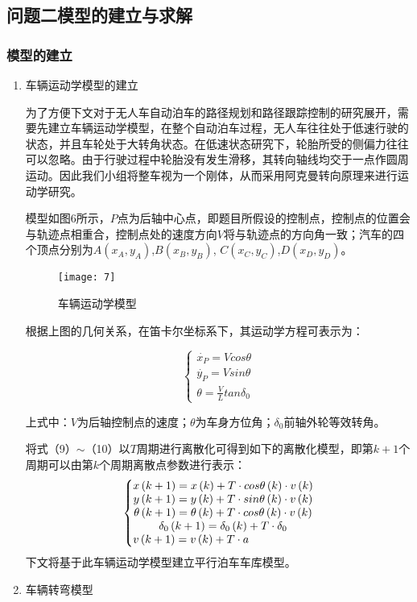 \documentclass{MathorCupmodeling}
\begin{document}
	\subsection{问题二模型的建立与求解}
	\subsubsection{模型的建立}
	\begin{enumerate}
		\item 车辆运动学模型的建立
		
		为了方便下文对于无人车自动泊车的路径规划和路径跟踪控制的研究展开，需要先建立车辆运动学模型，在整个自动泊车过程，无人车往往处于低速行驶的状态，并且车轮处于大转角状态。在低速状态研究下，轮胎所受的侧偏力往往可以忽略。由于行驶过程中轮胎没有发生滑移，其转向轴线均交于一点作圆周运动。因此我们小组将整车视为一个刚体，从而采用阿克曼转向原理来进行运动学研究。

		模型如图6所示，$P$点为后轴中心点，即题目所假设的控制点，控制点的位置会与轨迹点相重合，控制点处的速度方向$V$将与轨迹点的方向角一致；汽车的四个顶点分别为$A(x_A,y_A)$,$ B(x_B,y_B)$, $C(x_C,y_C)$,$ D(x_D,y_D)$\cite{label3}。

		\begin{figure}[H]
			\centering
			\texttt{[image: 7]}
			\caption{车辆运动学模型}
			\label{fig:circuit-diagram}
		\end{figure}
		根据上图的几何关系，在笛卡尔坐标系下，其运动学方程可表示为：

		\begin{equation}
			\left\{\begin{matrix}
				\dot{x_P}=Vcos\theta
				\\ \dot{y_P}=Vsin\theta
				\\ \theta=\frac{V}{L}tan\delta_0
				\end{matrix}\right.
		\end{equation}

		上式中：$V$为后轴控制点的速度；$\theta$为车身方位角；$\delta_0$前轴外轮等效转角。
	
		将式（9）$\sim$（10）以$T$周期进行离散化可得到如下的离散化模型，即第$k+1$个周期可以由第$k$个周期离散点参数进行表示：
		\begin{equation}
			\left\{\begin{matrix}
				x\left(k+1\right)=x\left(k\right)+T\cdot cos\theta\left(k\right)\cdot v\left(k\right)
			   \\ y\left(k+1\right)=y\left(k\right)+T\cdot sin\theta\left(k\right)\cdot v\left(k\right)
			   \\ \theta\left(k+1\right)=\theta\left(k\right)+T\cdot cos\theta\left(k\right)\cdot v\left(k\right)
			   \\ \delta_0\left(k+1\right)=\delta_0\left(k\right)+T\cdot\delta_0
			   \\ v\left(k+1\right)=v\left(k\right)+T\cdot a\hfill
			   \end{matrix}\right.
		\end{equation}
		下文将基于此车辆运动学模型建立平行泊车车库模型。
		\item 车辆转弯模型
		

\end{enumerate}
\end{document}
